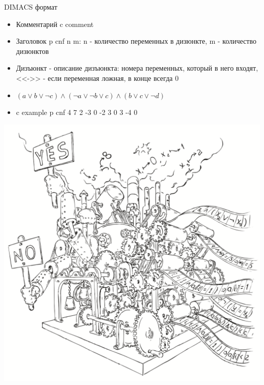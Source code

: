 \documentclass{beamer}
\begin{document}
\begin{frame}{DIMACS формат}
\begin{itemize}
\item Комментарий c comment
\item Заголовок p cnf n m: n - количество переменных в дизюнкте, m - количество дизюнктов
\item Дизъюнкт - описание дизъюнкта: номера переменных, который в него входят, <<->> - если переменная ложная, в конце всегда 0
\item $(a \vee b \vee \lnot c) \wedge (\lnot a \vee \lnot b \vee c) \wedge (b \vee c \vee \lnot d)$
\item c example\newline
p cnf 4 7 2 -3 0 -2 3 0 3 -4 0\newline
\end{itemize}
\end{frame}

\begin{frame}
\includegraphics[scale=0.5]{../decision-procedure.png}
\end{frame}
\end{document}
